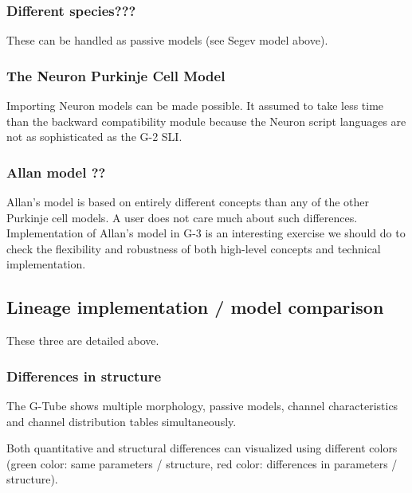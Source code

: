 \documentclass[12pt]{article}
\begin{document}
\subsubsection{Different species???}
These can be handled as passive models (see Segev model above).


\subsubsection{The Neuron Purkinje Cell Model}
Importing Neuron models can be made possible.  It assumed to take less
time than the backward compatibility module because the Neuron script
languages are not as sophisticated as the G-2 SLI.

\subsubsection{Allan model ??}

Allan's model is based on entirely different concepts than any of the
other Purkinje cell models.  A user does not care much about such
differences.  Implementation of Allan's model in G-3 is an interesting
exercise we should do to check the flexibility and robustness of both
high-level concepts and technical implementation.


\subsection{Lineage implementation / model comparison}

These three are detailed above.


\subsubsection{Differences in structure}

The G-Tube shows multiple morphology, passive models, channel
characteristics and channel distribution tables simultaneously.

Both quantitative and structural differences can visualized using
different colors (green color: same parameters / structure, red color:
differences in parameters / structure).
\end{document}

